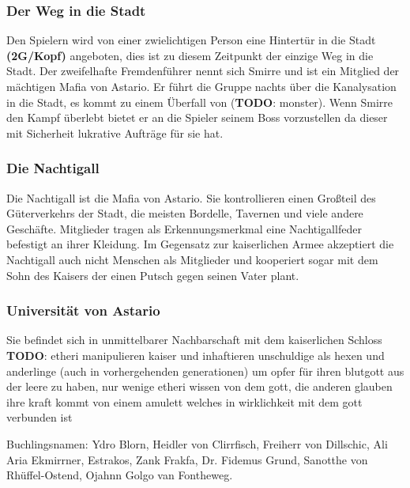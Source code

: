 \documentclass[11pt, twoside]{article}
\begin{document}
\subsubsection{Der Weg in die Stadt}
\label{sec:org14c5134}
Den Spielern wird von einer zwielichtigen Person eine Hintertür in die Stadt \textbf{(2G/Kopf)} angeboten, dies ist zu diesem Zeitpunkt der einzige Weg in die Stadt.
Der zweifelhafte Fremdenführer nennt sich Smirre und ist ein Mitglied der mächtigen Mafia von Astario. Er führt die Gruppe nachts über die Kanalysation in die Stadt, es kommt zu einem Überfall von (\textbf{TODO}: monster). Wenn Smirre den Kampf überlebt bietet er an die Spieler seinem Boss vorzustellen da dieser mit Sicherheit lukrative Aufträge für sie hat.
\subsubsection{Die Nachtigall}
\label{sec:orga14c585}
Die Nachtigall ist die Mafia von Astario. Sie kontrollieren einen Großteil des Güterverkehrs der Stadt, die meisten Bordelle, Tavernen und viele andere Geschäfte.
Mitglieder tragen als Erkennungsmerkmal eine Nachtigallfeder befestigt an ihrer Kleidung.
Im Gegensatz zur kaiserlichen Armee akzeptiert die Nachtigall auch nicht Menschen als Mitglieder und kooperiert sogar mit dem Sohn des Kaisers der einen Putsch gegen seinen Vater plant.
\subsubsection{Universität von Astario}
\label{sec:org45c07d0}
Sie befindet sich in unmittelbarer Nachbarschaft mit dem kaiserlichen Schloss
\textbf{TODO}: etheri manipulieren kaiser und inhaftieren unschuldige als hexen und anderlinge (auch in vorhergehenden generationen) um opfer für ihren blutgott aus der leere zu haben, nur wenige etheri wissen von dem gott, die anderen glauben ihre kraft kommt von einem amulett welches in wirklichkeit mit dem gott verbunden ist

Buchlingsnamen: Ydro Blorn, Heidler von Clirrfisch, Freiherr von Dillschic, Ali Aria Ekmirrner, Estrakos, Zank Frakfa, Dr. Fidemus Grund, Sanotthe von Rhüffel-Ostend, Ojahnn Golgo van Fontheweg.
\end{document}
